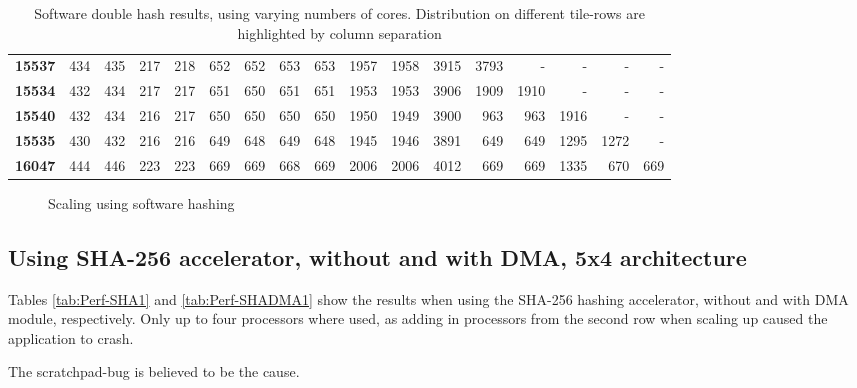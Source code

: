 \begin{appendix}
\begin{table}
\begin{tabular}{| l || r r r r | r r r r | r r r | r r r r r |}
  \textbf{15537} & 434 & 435 & 217 & 218 & 652 & 652 & 653 & 653 & 1957 & 1958 & 3915 &3793 & - & - & - & -\\
  \textbf{15534} & 432 & 434 & 217 & 217 & 651 & 650 & 651 & 651 & 1953 & 1953 & 3906 & 1909 & 1910 & - & - & -\\
  \textbf{15540} & 432 & 434 & 216 & 217 & 650 & 650 & 650 & 650 & 1950 & 1949 & 3900 & 963 & 963 & 1916 & - & -\\
  \textbf{15535} & 430 & 432 & 216 & 216 & 649 & 648 & 649 & 648 & 1945 & 1946 & 3891 & 649 & 649 & 1295 & 1272 & -\\
  \textbf{16047} & 444 & 446 & 223 & 223 & 669 & 669 & 668 & 669 & 2006 & 2006 & 4012 & 669 & 669 & 1335 & 670 & 669\\
  \hline  
\end{tabular}
\caption{Software double hash results, using varying numbers of cores. Distribution on different tile-rows are highlighted by column separation}
\label{tab:Full-Perf-SW1}
\end{table}

\begin{figure}
	\caption{Scaling using software hashing}
	\label{fig:sw-scaling1}
\end{figure}

\subsection{Using SHA-256 accelerator, without and with DMA, 5x4 architecture}
Tables \ref{tab:Perf-SHA1} and \ref{tab:Perf-SHADMA1} show the results when using the SHA-256 hashing accelerator, without and with DMA module, respectively.
Only up to four processors where used, as adding in processors from the second row when scaling up caused the application to crash.

The scratchpad-bug is believed to be the cause.


\end{appendix}
